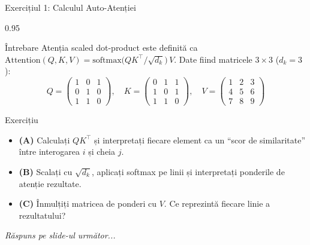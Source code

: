 \documentclass[9pt, aspectratio=169, t]{beamer}
\begin{document}
\begin{frame}{Exercițiul 1: Calculul Auto-Atenției}
    \begin{cminipage}{0.95\textwidth}
    {\small
    \begin{alertblock}{Întrebare}
        Atenția scaled dot-product este definită ca
        $\text{Attention}(Q,K,V) = \text{softmax}\!\bigl(QK^\top / \sqrt{d_k}\bigr)\,V$.
        Date fiind matricele $3\times 3$ ($d_k = 3$):
        \[
            Q = \begin{pmatrix} 1 & 0 & 1 \\ 0 & 1 & 0 \\ 1 & 1 & 0 \end{pmatrix},\quad
            K = \begin{pmatrix} 0 & 1 & 1 \\ 1 & 0 & 1 \\ 1 & 1 & 0 \end{pmatrix},\quad
            V = \begin{pmatrix} 1 & 2 & 3 \\ 4 & 5 & 6 \\ 7 & 8 & 9 \end{pmatrix}
        \]
    \end{alertblock}

    \vspace{0.1cm}

    \begin{block}{Exercițiu}
        \begin{itemize}\setlength{\itemsep}{3pt}
            \item \textcolor{MainBlue}{\textbf{(A)}} Calculați $QK^\top$ și interpretați fiecare element ca un ``scor de similaritate'' între interogarea $i$ și cheia $j$.
            \item \textcolor{MainBlue}{\textbf{(B)}} Scalați cu $\sqrt{d_k}$, aplicați softmax pe linii și interpretați ponderile de atenție rezultate.
            \item \textcolor{MainBlue}{\textbf{(C)}} Înmulțiți matricea de ponderi cu $V$. Ce reprezintă fiecare linie a rezultatului?
        \end{itemize}
    \end{block}

    \vspace{0.1cm}

    \begin{center}
        \textit{Răspuns pe slide-ul următor...}
    \end{center}
    }
    \end{cminipage}
\end{frame}
\end{document}
